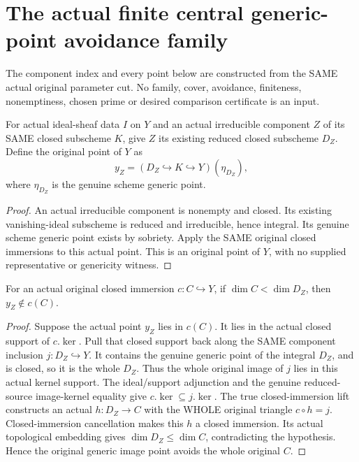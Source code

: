 \section{The actual finite central generic-point avoidance family}
The component index and every point below are constructed from the SAME
actual original parameter cut. No family, cover, avoidance, finiteness,
nonemptiness, chosen prime or desired comparison certificate is an input.

\begin{definition}
\label{def:pl-gauss-original-component-generic-point}
\leanok
For actual ideal-sheaf data $I$ on $Y$ and an actual irreducible component
$Z$ of its SAME closed subscheme $K$, give $Z$ its existing reduced
closed subscheme $D_Z$. Define the original point of $Y$ as
\[
 y_Z=(D_Z\hookrightarrow K\hookrightarrow Y)(\eta_{D_Z}),
\]
where $\eta_{D_Z}$ is the genuine scheme generic point.
\end{definition}
\begin{proof}
An actual irreducible component is nonempty and closed. Its existing
vanishing-ideal subscheme is reduced and irreducible, hence integral.
Its genuine scheme generic point exists by sobriety. Apply the SAME
original closed immersions to this actual point. This is an original
point of $Y$, with no supplied representative or genericity witness.
\end{proof}

\begin{lemma}
\label{lem:pl-gauss-original-component-generic-avoids-smaller-closed-scheme}
\leanok
For an actual original closed immersion $c:C\hookrightarrow Y$, if
$\dim C<\dim D_Z$, then $y_Z\notin c(C)$.
\end{lemma}
\begin{proof}
Suppose the actual point $y_Z$ lies in $c(C)$. It lies in the actual
closed support of $c.\ker$. Pull that closed support back along the
SAME component inclusion $j:D_Z\hookrightarrow Y$. It contains the
genuine generic point of the integral $D_Z$, and is closed, so it is
the whole $D_Z$. Thus the whole original image of $j$ lies in this
actual kernel support. The ideal/support adjunction and the genuine
reduced-source image-kernel equality give $c.\ker\subseteq j.\ker$.
The true closed-immersion lift constructs an actual $h:D_Z\to C$
with the WHOLE original triangle $c\circ h=j$. Closed-immersion
cancellation makes this $h$ a closed immersion. Its actual topological
embedding gives $\dim D_Z\le\dim C$, contradicting the hypothesis.
Hence the original generic image point avoids the whole original $C$.
\end{proof}

